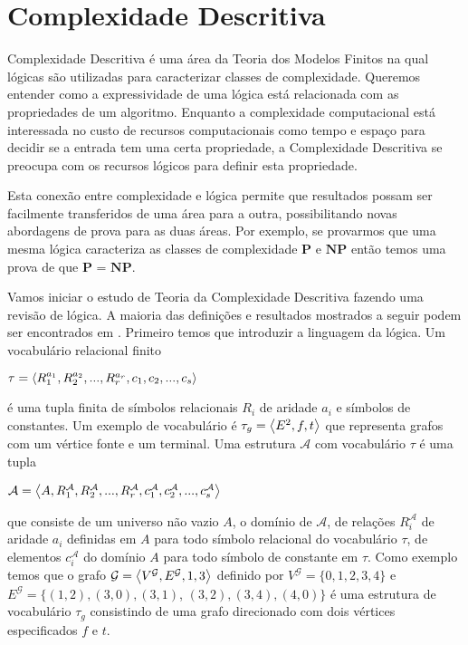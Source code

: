 \pagestyle{empty}
\cleardoublepage
\pagestyle{fancy}

\chapter{Complexidade Descritiva}\label{cap3}

Complexidade Descritiva é uma área da Teoria dos Modelos Finitos na qual lógicas são utilizadas para caracterizar classes de complexidade. Queremos entender como a expressividade de uma lógica está relacionada com as propriedades de um algoritmo. Enquanto a complexidade computacional está interessada no custo de recursos computacionais como tempo e espaço para decidir se a entrada tem uma certa propriedade, a Complexidade Descritiva se preocupa com os recursos lógicos para definir esta propriedade. 

Esta conexão entre complexidade e lógica permite que resultados possam ser facilmente transferidos de uma área para a outra, possibilitando novas abordagens de prova para as duas áreas. Por exemplo, se provarmos que uma mesma lógica caracteriza as classes de complexidade $\textbf{P}$ e $\textbf{NP}$ então temos uma prova de que $\textbf{P}$ = $\textbf{NP}$.

Vamos iniciar o estudo de Teoria da Complexidade Descritiva fazendo uma revisão de lógica.
A maioria das definições e resultados mostrados a seguir podem ser encontrados em \cite{immerman99}.
Primeiro temos que introduzir a linguagem da lógica. Um vocabulário relacional finito
\begin{center}
$\tau = \left \langle R_{1}^{a_1}, R_{2}^{a_2}, ..., R_{r}^{a_r}, c_1, c_2, ..., c_s \right \rangle $
\end{center} 
é uma tupla finita de símbolos relacionais $R_i$ de aridade $a_i$ e símbolos de constantes. Um exemplo de vocabulário é $\tau_g = \left \langle E^2, f, t \right \rangle $ que representa grafos com um vértice fonte e um terminal. 
Uma estrutura $\mathcal{A}$ com vocabulário $\tau$ é uma tupla
\begin{center}
$\mathcal{A} = \left \langle A, R_{1}^{\mathcal{A}}, R_{2}^{\mathcal{A}}, ..., R_{r}^{\mathcal{A}}, c_1^{\mathcal{A}}, c_2^{\mathcal{A}}, ..., c_s^{\mathcal{A}} \right \rangle $
\end{center} 
que consiste de um universo não vazio $A$, o domínio de $\mathcal{A}$, de relações $R_i^{\mathcal{A}}$ de aridade $a_i$ definidas em $A$ para todo símbolo relacional do vocabulário $\tau$, de elementos $c_i^{\mathcal{A}}$ do domínio $A$ para todo símbolo de constante em $\tau$. 
Como exemplo temos que o grafo $\mathcal{G} = \left \langle V^{\mathcal{G}}, E^{\mathcal{G}}, 1, 3 \right \rangle $ definido por $V^{\mathcal{G}} = \{0, 1, 2, 3, 4 \}$ e $E^{\mathcal{G}} = \{(1, 2), (3, 0), (3, 1)$, $(3, 2), (3,4), (4, 0)\}$ é uma estrutura de vocabulário $\tau_g$ consistindo de uma grafo direcionado com dois vértices especificados $f$ e $t$.

